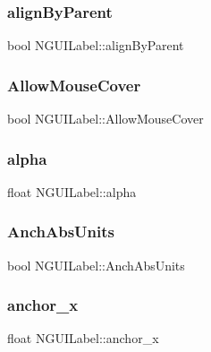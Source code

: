 \subsubsection{\texorpdfstring{align\+By\+Parent}{alignByParent}}
{\footnotesize\ttfamily bool N\+G\+U\+I\+Label\+::align\+By\+Parent}

\hypertarget{class_n_g_u_i_label_a896b42588636ae937e5a0ac65faf958e}{}\label{class_n_g_u_i_label_a896b42588636ae937e5a0ac65faf958e} 
\subsubsection{\texorpdfstring{Allow\+Mouse\+Cover}{AllowMouseCover}}
{\footnotesize\ttfamily bool N\+G\+U\+I\+Label\+::\+Allow\+Mouse\+Cover}

\hypertarget{class_n_g_u_i_label_a7bd2806e82582d2e09f63527739c36e2}{}\label{class_n_g_u_i_label_a7bd2806e82582d2e09f63527739c36e2} 
\subsubsection{\texorpdfstring{alpha}{alpha}}
{\footnotesize\ttfamily float N\+G\+U\+I\+Label\+::alpha}

\hypertarget{class_n_g_u_i_label_a8ce6bcad1ac1b264313c6a67a425898b}{}\label{class_n_g_u_i_label_a8ce6bcad1ac1b264313c6a67a425898b} 
\subsubsection{\texorpdfstring{Anch\+Abs\+Units}{AnchAbsUnits}}
{\footnotesize\ttfamily bool N\+G\+U\+I\+Label\+::\+Anch\+Abs\+Units}

\hypertarget{class_n_g_u_i_label_aac00f83113ff7a74617feba91a36d296}{}\label{class_n_g_u_i_label_aac00f83113ff7a74617feba91a36d296} 
\subsubsection{\texorpdfstring{anchor\+\_\+x}{anchor\_x}}
{\footnotesize\ttfamily float N\+G\+U\+I\+Label\+::anchor\+\_\+x}

